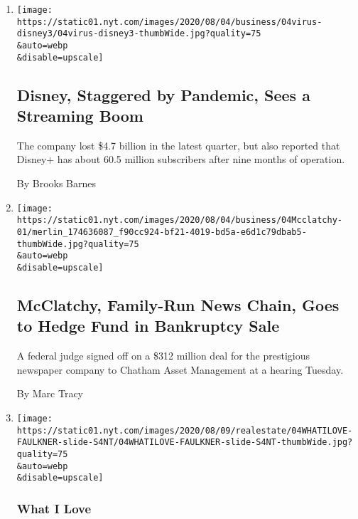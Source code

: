 \begin{enumerate}
\def\labelenumi{\arabic{enumi}.}
\item
  \href{/2020/08/04/business/media/disney-earnings-coronavirus.html}{}

  \texttt{[image: https://static01.nyt.com/images/2020/08/04/business/04virus-disney3/04virus-disney3-thumbWide.jpg?quality=75\\\&auto=webp\\\&disable=upscale]}

  \hypertarget{disney-staggered-by-pandemic-sees-a-streaming-boom}{%
  \subsection{Disney, Staggered by Pandemic, Sees a Streaming
  Boom}\label{disney-staggered-by-pandemic-sees-a-streaming-boom}}

  The company lost \$4.7 billion in the latest quarter, but also
  reported that Disney+ has about 60.5 million subscribers after nine
  months of operation.

  By Brooks Barnes
\item
  \href{/2020/08/04/business/media/mcclatchy-newspapers-bankrutpcy-chatham.html}{}

  \texttt{[image: https://static01.nyt.com/images/2020/08/04/business/04Mcclatchy-01/merlin\_174636087\_f90cc924-bf21-4019-bd5a-e6d1c79dbab5-thumbWide.jpg?quality=75\\\&auto=webp\\\&disable=upscale]}

  \hypertarget{mcclatchy-family-run-news-chain-goes-to-hedge-fund-in-bankruptcy-sale}{%
  \subsection{McClatchy, Family-Run News Chain, Goes to Hedge Fund in
  Bankruptcy
  Sale}\label{mcclatchy-family-run-news-chain-goes-to-hedge-fund-in-bankruptcy-sale}}

  A federal judge signed off on a \$312 million deal for the prestigious
  newspaper company to Chatham Asset Management at a hearing Tuesday.

  By Marc Tracy
\item
  \href{/2020/08/04/realestate/harris-faulkner-home-fox-news.html}{}

  \texttt{[image: https://static01.nyt.com/images/2020/08/09/realestate/04WHATILOVE-FAULKNER-slide-S4NT/04WHATILOVE-FAULKNER-slide-S4NT-thumbWide.jpg?quality=75\\\&auto=webp\\\&disable=upscale]}

  \hypertarget{what-i-love}{%
  \subsubsection{What I Love}\label{what-i-love}}


\end{enumerate}
